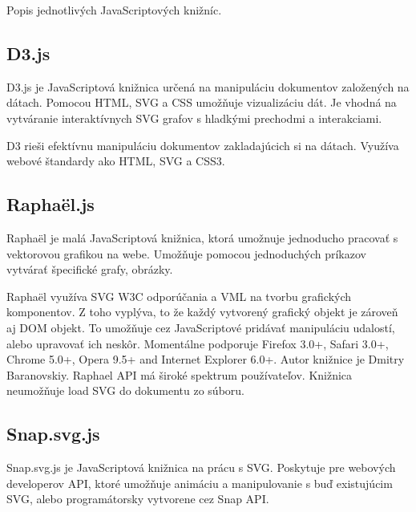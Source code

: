 Popis jednotlivých JavaScriptových knižníc.



\subsection{D3.js}

D3.js je JavaScriptová knižnica určená na manipuláciu dokumentov založených na dátach. Pomocou \acs{HTML}, \acs{SVG} a \acs{CSS} umožňuje vizualizáciu dát.
Je vhodná na vytváranie interaktívnych SVG grafov s hladkými prechodmi a interakciami. 

D3 rieši efektívnu manipuláciu dokumentov zakladajúcich si na dátach. Využíva webové štandardy ako \acs{HTML}, \acs{SVG} a \acs{CSS}3. \cite{d3js}

\subsection{Raphaël.js}

Raphaël je malá JavaScriptová knižnica, ktorá umožnuje jednoducho pracovať s vektorovou grafikou na webe. Umožňuje pomocou jednoduchých príkazov vytvárať špecifické grafy, obrázky. 

Raphaël využíva \acs{SVG} \acs{W3C} odporúčania a \acs{VML} na tvorbu grafických komponentov. Z toho vyplýva, to že každý vytvorený grafický objekt je zároveň aj DOM objekt. To umožňuje cez JavaScriptové pridávať manipuláciu udalostí, alebo upravovať ich neskôr.
Momentálne podporuje Firefox 3.0+, Safari 3.0+, Chrome 5.0+, Opera 9.5+ and Internet Explorer 6.0+.\cite{Raphael}
Autor knižnice je Dmitry Baranovskiy. Raphael API má široké spektrum používateľov. 
Knižnica neumožňuje load SVG do dokumentu zo súboru. 



\subsection{Snap.svg.js}

Snap.svg.js je JavaScriptová knižnica na prácu s SVG. Poskytuje pre webových developerov \acs{API}, ktoré umožňuje animáciu a manipulovanie s buď existujúcim SVG, alebo programátorsky vytvorene cez Snap API. 


